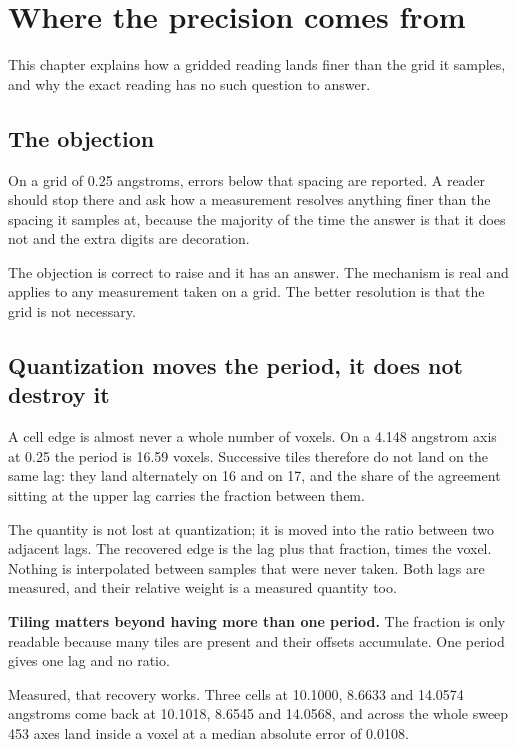 \chapter{Where the precision comes from}

This chapter explains how a gridded reading lands finer than the grid it samples, and why the exact reading has no such question to answer.

\section{The objection}

On a grid of 0.25 angstroms, errors below that spacing are reported. A reader should stop there and ask how a measurement resolves anything finer than the spacing it samples at, because the majority of the time the answer is that it does not and the extra digits are decoration.

The objection is correct to raise and it has an answer. The mechanism is real and applies to any measurement taken on a grid. The better resolution is that the grid is not necessary.

\section{Quantization moves the period, it does not destroy it}

A cell edge is almost never a whole number of voxels. On a 4.148 angstrom axis at 0.25 the period is 16.59 voxels. Successive tiles therefore do not land on the same lag: they land alternately on 16 and on 17, and the share of the agreement sitting at the upper lag carries the fraction between them.

The quantity is not lost at quantization; it is moved into the ratio between two adjacent lags. The recovered edge is the lag plus that fraction, times the voxel. Nothing is interpolated between samples that were never taken. Both lags are measured, and their relative weight is a measured quantity too.

\textbf{Tiling matters beyond having more than one period.} The fraction is only readable because many tiles are present and their offsets accumulate. One period gives one lag and no ratio.

Measured, that recovery works. Three cells at 10.1000, 8.6633 and 14.0574 angstroms come back at 10.1018, 8.6545 and 14.0568, and across the whole sweep 453 axes land inside a voxel at a median absolute error of 0.0108.


